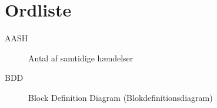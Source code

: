 \chapter{Ordliste}


\begin{description}

\item[AASH] Antal af samtidige hændelser
\item[BDD] Block Definition Diagram (Blokdefinitionsdiagram)

\end{description}